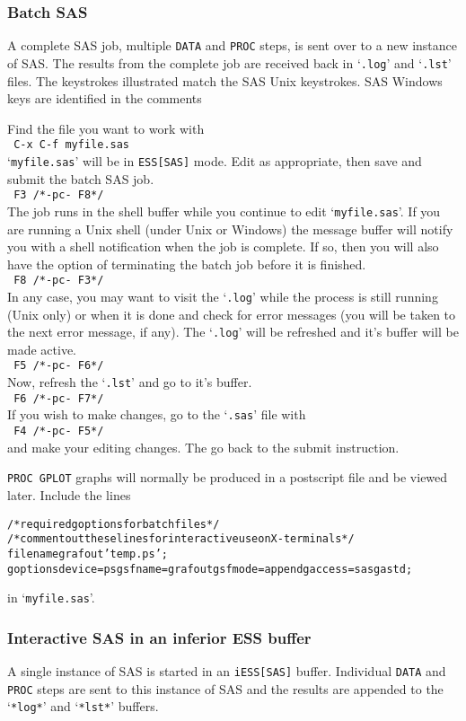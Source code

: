 \documentclass{article}
\newcommand{\stexttt}[1]{{\small\texttt{#1}}}
\newcommand{\elcode}[1]{\\{\stexttt{\hspace*{2em} #1}}\\}
\newenvironment{Salltt}{\small\begin{alltt}}{\end{alltt}}
\newcommand{\file}[1]{`\stexttt{#1}'}
\begin{document}
\subsubsection{Batch SAS}
\label{sec:SAS:batch}

A complete SAS job, multiple \stexttt{DATA} and \stexttt{PROC} steps,
is sent over to a new instance of SAS.  The results from the complete
job are received back in \file{.log} and \file{.lst} files.
The keystrokes illustrated match the SAS Unix keystrokes.
SAS Windows keys are identified in the comments

Find the file you want to work with
    \elcode{C-x C-f myfile.sas}
\file{myfile.sas} will be in \stexttt{ESS[SAS]} mode.
Edit as appropriate, then save and submit the batch SAS job.
    \elcode{F3  /*-pc- F8*/}
The job runs in the shell buffer while you continue to edit 
\file{myfile.sas}.  If you are running a Unix shell (under Unix or
Windows) the message buffer will notify you with a shell
notification when the job is complete.  If so, then you 
will also have the option of terminating the batch job
before it is finished.
    \elcode{F8  /*-pc- F3*/}
In any case, you may want to visit the \file{.log} while the process
is still running (Unix only) or when it is done and check for
error messages 
(you will be taken to the next error message, if any).
The \file{.log} will be refreshed and it's buffer will be made active.
    \elcode{F5  /*-pc- F6*/}
Now, refresh the \file{.lst} and go to it's buffer.
    \elcode{F6  /*-pc- F7*/}
If you wish to make changes, go to the \file{.sas} file with
    \elcode{F4 /*-pc- F5*/}
and make your editing changes.  The go back to the submit instruction.

\stexttt{PROC GPLOT} graphs will normally be produced in a postscript
file and be viewed later.  Include the lines
\begin{Salltt}
    /* required goptions for batch files */
    /* comment out these lines for interactive use on X-terminals*/
    filename grafout 'temp.ps';
    goptions device=ps gsfname=grafout gsfmode=append gaccess=sasgastd;
\end{Salltt}
\noindent
in \file{myfile.sas}.


\subsubsection{Interactive SAS in an inferior ESS buffer}
A single instance of SAS is started in an \stexttt{iESS[SAS]} buffer.
Individual \stexttt{DATA} and \stexttt{PROC} steps are sent to this
instance of SAS and the results are appended to the \file{*log*}
and \file{*lst*} buffers.
\end{document}
